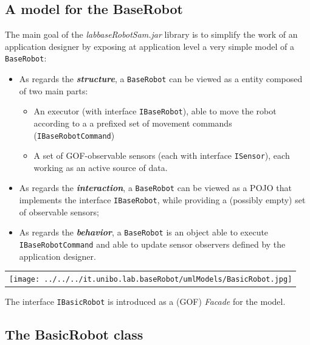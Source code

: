 \subsection{A model for the BaseRobot}

The main goal of the \textit{labbaseRobotSam.jar} library is to simplify the work of an application designer by exposing at application level a very simple model of a \texttt{BaseRobot}:

\begin{itemize}
\item As regards the \textbf{\textit{structure}}, a \texttt{BaseRobot} can be viewed as a entity composed of two main parts:
\begin{itemize}
\item An executor (with interface \texttt{IBaseRobot}), able to move the robot according to a  a prefixed set of movement commands (\texttt{IBaseRobotCommand}) 
\item A set of GOF-observable sensors (each with interface \texttt{ISensor}), each working as an active source of data.
\end{itemize}
\item As regards the \textbf{\textit{interaction}}, a \texttt{BaseRobot} can be viewed as a POJO that implements the interface \texttt{IBaseRobot}, while providing a (possibly empty) set of observable sensors;
\item  As regards the \textbf{\textit{behavior}}, a \texttt{BaseRobot} is an object able to execute \texttt{IBaseRobotCommand} and able to update sensor observers defined by the application designer.
\end{itemize}


\begin{center}
\begin{tabular}{ c }
     \texttt{[image: ../../../it.unibo.lab.baseRobot/umlModels/BasicRobot.jpg]}\\
\end{tabular} 
\end{center}

The interface \texttt{IBasicRobot} is introduced as a (GOF) \textit{Facade} for the model.


\subsection{The BasicRobot class}

